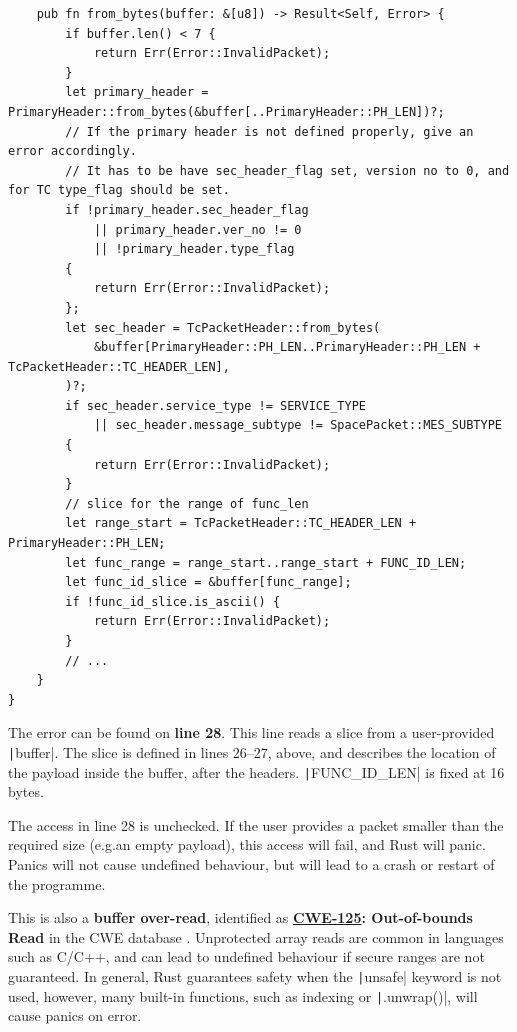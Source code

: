 \documentclass[a4paper,nobib,justified,final]{tufte-book}
\begin{document}
\begin{fullwidth}
\begin{verbatim}
    pub fn from_bytes(buffer: &[u8]) -> Result<Self, Error> {
        if buffer.len() < 7 {
            return Err(Error::InvalidPacket);
        }
        let primary_header = PrimaryHeader::from_bytes(&buffer[..PrimaryHeader::PH_LEN])?;
        // If the primary header is not defined properly, give an error accordingly.
        // It has to be have sec_header_flag set, version no to 0, and for TC type_flag should be set.
        if !primary_header.sec_header_flag
            || primary_header.ver_no != 0
            || !primary_header.type_flag
        {
            return Err(Error::InvalidPacket);
        };
        let sec_header = TcPacketHeader::from_bytes(
            &buffer[PrimaryHeader::PH_LEN..PrimaryHeader::PH_LEN + TcPacketHeader::TC_HEADER_LEN],
        )?;
        if sec_header.service_type != SERVICE_TYPE
            || sec_header.message_subtype != SpacePacket::MES_SUBTYPE
        {
            return Err(Error::InvalidPacket);
        }
        // slice for the range of func_len
        let range_start = TcPacketHeader::TC_HEADER_LEN + PrimaryHeader::PH_LEN;
        let func_range = range_start..range_start + FUNC_ID_LEN;
        let func_id_slice = &buffer[func_range];
        if !func_id_slice.is_ascii() {
            return Err(Error::InvalidPacket);
        }
        // ...
    }
}
\end{verbatim}

The error can be found on \textbf{line 28}. This line reads a slice from a user-provided \texttt|buffer|. The slice is defined in lines 26--27, above, and describes the location of the payload inside the buffer, after the headers. \texttt|FUNC_ID_LEN| is fixed at 16 bytes.

The access in line 28 is unchecked. If the user provides a packet smaller than the required size (e.g.\@ an empty payload), this access will fail, and Rust will panic. Panics will not cause undefined behaviour, but will lead to a crash or restart of the programme.

This is also a \textbf{buffer over-read}, identified as \textbf{\href{https://cwe.mitre.org/data/definitions/125.html}{CWE-125}: Out-of-bounds Read} in the \acs{CWE} database \cite{021_Martin_revised}. Unprotected array reads are common in languages such as C/C++, and can lead to undefined behaviour if secure ranges are not guaranteed. In general, Rust guarantees safety when the \texttt|unsafe| keyword is not used, however, many built-in functions, such as indexing or \texttt|.unwrap()|, will cause panics on error.

\end{fullwidth}
\end{document}
